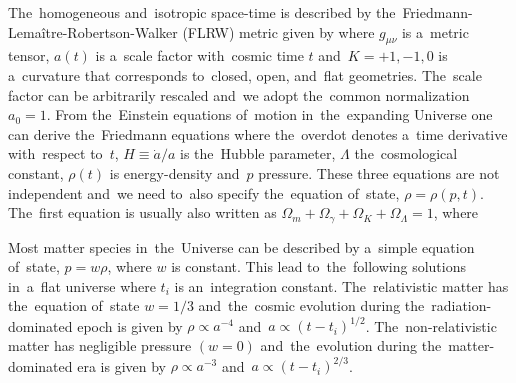 The~homogeneous and~isotropic space-time is described by the~Friedmann-Lema\^{i}tre-Robertson-Walker (FLRW) metric given by
where $g_{\mu\nu}$ is a~metric tensor, $a(t)$ is a~scale factor with~cosmic time $t$ and~$K=+1,-1,0$ is a~curvature that corresponds to~closed, open, and~flat geometries. The~scale factor can be arbitrarily rescaled and~we adopt the~common normalization $a_0=1$. From the~Einstein equations of~motion in~the~expanding Universe one can derive the~Friedmann equations
where the~overdot denotes a~time derivative with~respect to~$t$, $H\equiv\dot a/a$ is the~Hubble parameter, $\Lambda$ the~cosmological constant, $\rho(t)$ is energy-density and~$p$ pressure. These three equations are not independent and~we need to~also specify the~equation of~state, $\rho=\rho(p,t)$. The~first equation is usually also written as $\Omega_m+\Omega_\gamma+\Omega_K+\Omega_\Lambda=1$, where

Most matter species in~the~Universe can be described by a~simple equation of~state, $p=w\rho$, where $w$ is constant. This lead to~the~following solutions in~a~flat universe
where $t_i$ is an~integration constant. The~relativistic matter has the~equation of~state $w=1/3$ and~the~cosmic evolution during the~radiation-dominated epoch is given by $\rho\propto a^{-4}$ and~$a\propto(t-t_i)^{1/2}$. The~non-relativistic matter has negligible pressure $(w=0)$ and~the~evolution during the~matter-dominated era is given by $\rho\propto a^{-3}$ and~$a\propto(t-t_i)^{2/3}$.

